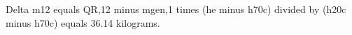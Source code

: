Delta m12 equals QR,12 minus mgen,1 times (he minus h70c) divided by (h20c minus h70c) equals 36.14 kilograms.